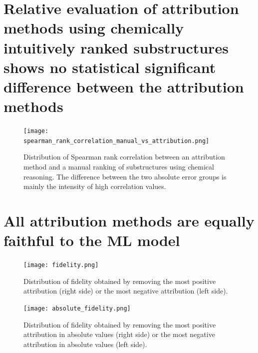\section{Relative evaluation of attribution methods using chemically intuitively ranked substructures shows no statistical
significant difference between the attribution methods}

\begin{figure}[h]
    \centering
    \texttt{[image: spearman\_rank\_correlation\_manual\_vs\_attribution.png]}
    \caption{Distribution of Spearman rank correlation between an attribution method 
        and a manual ranking of substructures using chemical reasoning. The difference 
        between the two absolute error groups is mainly the intensity of high 
        correlation values.
    }
    \label{fig:spearman_corr_manual}
\end{figure}


\section{All attribution methods are equally faithful to the ML model}

\begin{figure}[h]
    \centering
    \texttt{[image: fidelity.png]}
    \caption{Distribution of fidelity obtained by removing the most positive 
        attribution (right side) or the most negative attribution (left side).
    }
    \label{fig:fidelity}
\end{figure}


\begin{figure}[h]
    \centering
    \texttt{[image: absolute\_fidelity.png]}
    \caption{Distribution of fidelity obtained by removing the most positive 
        attribution in absolute values (right side) or the most negative 
        attribution in absolute values (left side).
    }
    \label{fig:fidelity}
\end{figure}
